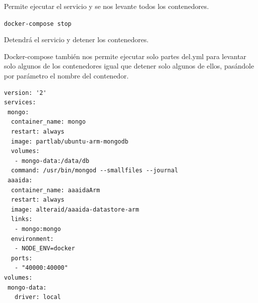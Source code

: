 Permite ejecutar el servicio y se nos levante todos los contenedores.

\begin{center}
\texttt{docker-compose stop}
\end{center} 

Detendrá el servicio y detener los contenedores. 
\newline

Docker-compose también nos permite ejecutar solo partes del.yml para levantar solo algunos de los contenedores igual que detener solo algunos de ellos, pasándole por parámetro el nombre del contenedor. 
\begin{center}
\begin{verbatim}
version: '2'
services:
 mongo:
  container_name: mongo
  restart: always
  image: partlab/ubuntu-arm-mongodb
  volumes:
   - mongo-data:/data/db
  command: /usr/bin/mongod --smallfiles --journal
 aaaida:
  container_name: aaaidaArm
  restart: always
  image: alteraid/aaaida-datastore-arm
  links:
   - mongo:mongo 
  environment:
   - NODE_ENV=docker
  ports:
   - "40000:40000"
volumes:
 mongo-data:
   driver: local
\end{verbatim}
\end{center} 
